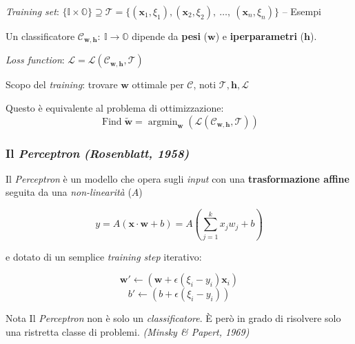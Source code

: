 \documentclass{beamer}
\DeclareMathOperator*{\argmin}{argmin}
\DeclareMathOperator*{\Find}{Find}
\begin{document}
{\begin{frame}
	\textit{Training set}: $\{\mathbb{I}\times\mathbb{O}\} \supseteq \mathcal{T} = \{(\boldsymbol{x}_1, \xi_1), (\boldsymbol{x}_2, \xi_2), \ \dots,\ (\boldsymbol{x}_n, \xi_n)\}$ -- Esempi

	\hfill\break

	Un classificatore $\mathcal{C}_{\boldsymbol{w}, \boldsymbol{h}}: \ \mathbb{I} \rightarrow \mathbb{O}$ dipende da \textbf{pesi} ($\boldsymbol{w}$) e \textbf{iperparametri} ($\boldsymbol{h}$).


	\textit{Loss function}: $\mathcal{L} = \mathcal{L}(\mathcal{C}_{\boldsymbol{w}, \boldsymbol{h}}, \mathcal{T})$

	\hfill\break

	Scopo del \textit{training}: trovare $\boldsymbol{w}$ ottimale per $\mathcal{C}$, noti $\mathcal{T}, \boldsymbol{h}, \mathcal{L}$


	\begin{block}{Questo è equivalente al problema di \alert{ottimizzazione}:}
		$$\Find \boldsymbol{\tilde{w}} = \argmin_{\boldsymbol{w}}\left(\mathcal{L}\left(\mathcal{C}_{\boldsymbol{w}, \boldsymbol{h}}, \mathcal{T}\right)\right)$$
	\end{block}
\end{frame}


\begin{frame}
	\frametitle{Il \textit{Perceptron} \textit{(Rosenblatt, 1958)}}

	Il \textit{Perceptron} è un modello che opera sugli \textit{input} con una \textbf{trasformazione affine} seguita da una \alert{\textit{non-linearità}} ($A$)

	$$
	y = A \left( \boldsymbol{x} \cdot \boldsymbol{w} + b \right) = A \left( \sum_{j=1}^{k}{x_j w_j + b} \right)
	$$

	e dotato di un semplice \textit{training step} iterativo:

	$$
	\boldsymbol{w'} \leftarrow \left( \boldsymbol{w} + \epsilon \left( \xi_i - y_i \right) \boldsymbol{x}_i  \right)
	$$
	$$
	b' \leftarrow \left( b + \epsilon \left( \xi_i - y_i \right) \right)
	$$

	\begin{alertblock}{Nota}
		Il \textit{Perceptron} non è solo un \textit{classificatore}. È però in grado di risolvere solo una ristretta classe di problemi. \textit{(Minsky \& Papert, 1969)}
	\end{alertblock}


\end{frame}}
\end{document}
